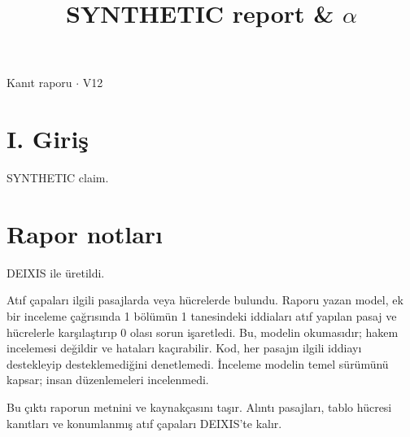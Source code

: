 \documentclass[journal]{IEEEtran}
\begin{document}
\renewcommand{\abstractname}{Özet}
\renewcommand{\IEEEkeywordsname}{Dizin Terimleri}
\renewcommand{\refname}{Kaynaklar}

\title{SYNTHETIC report \& \ensuremath{\alpha}}

\maketitle

\noindent Kanıt raporu \ensuremath{\cdot} V12

\section*{I. Giriş}

SYNTHETIC claim. \cite{Synth26}

\section*{Rapor notları}

DEIXIS ile üretildi.

Atıf çapaları ilgili pasajlarda veya hücrelerde bulundu. Raporu yazan model, ek bir inceleme çağrısında 1 bölümün 1 tanesindeki iddiaları atıf yapılan pasaj ve hücrelerle karşılaştırıp 0 olası sorun işaretledi. Bu, modelin okumasıdır; hakem incelemesi değildir ve hataları kaçırabilir. Kod, her pasajın ilgili iddiayı destekleyip desteklemediğini denetlemedi. İnceleme modelin temel sürümünü kapsar; insan düzenlemeleri incelenmedi.

Bu çıktı raporun metnini ve kaynakçasını taşır. Alıntı pasajları, tablo hücresi kanıtları ve konumlanmış atıf çapaları DEIXIS'te kalır.




\end{document}
